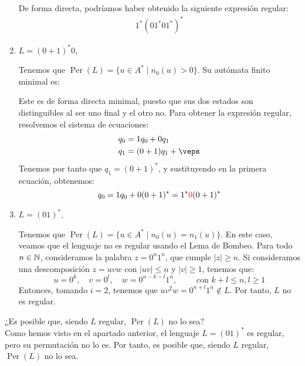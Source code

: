 \begin{ejercicio}
\begin{enumerate}
        De forma directa, podríamos haber obtenido la siguiente expresión regular:
        \begin{align*}
            1^*(01^*01^*)^*
        \end{align*}
        \item $L = (0 + 1)^*0$,
        
        Tenemos que $\operatorname{Per}(L) = \{u\in A^*\mid n_0(u)>0\}$.
        Su autómata finito minimal es:
        \begin{figure}[H]
            \centering
        \end{figure}
        Este es de forma directa minimal, puesto que sus dos estados son distinguibles al ser uno final y el otro no. Para obtener la expresión regular, resolvemos el sistema de ecuaciones:
        \begin{align*}
            q_0 &= 1q_0+0q_1\\
            q_1 &= (0+1)q_1 + \veps
        \end{align*}
        Tenemos por tanto que $q_1=(0+1)^*$, y sustituyendo en la primera ecuación, obtenemos:
        \begin{equation*}
            q_0 = 1q_0 + 0(0+1)^* = 1^*{\color{red}0}(0+1)^*
        \end{equation*}

        \item $L = (01)^*$.
        
        Tenemos que $\operatorname{Per}(L) = \{u\in A^*\mid n_0(u)=n_1(u)\}$.
        En este caso, veamos que el lenguaje no es regular usando el Lema de Bombeo. Para todo $n\in \mathbb{N}$, consideramos la palabra $z=0^n1^n$, que cumple $|z|\geq n$. Si consideramos una descomposición $z=uvw$ con $|uv|\leq n$ y $|v|\geq 1$, tenemos que:
        \begin{equation*}
            u=0^k,\quad v=0^l,\quad w=0^{n-k-l}1^n, \qquad \text{ con } k+l\leq n, l\geq 1
        \end{equation*}
        Entonces, tomando $i=2$, tenemos que $uv^2w=0^{n+l}1^n\notin L$. Por tanto, $L$ no es regular.
    \end{enumerate}
    ¿Es posible que, siendo $L$ regular, $\operatorname{Per}(L)$ no lo sea?\\

    Como hemos visto en el apartado anterior, el lenguaje $L=(01)^*$ es regular, pero su permutación no lo es. Por tanto, es posible que, siendo $L$ regular, $\operatorname{Per}(L)$ no lo sea.
\end{ejercicio}